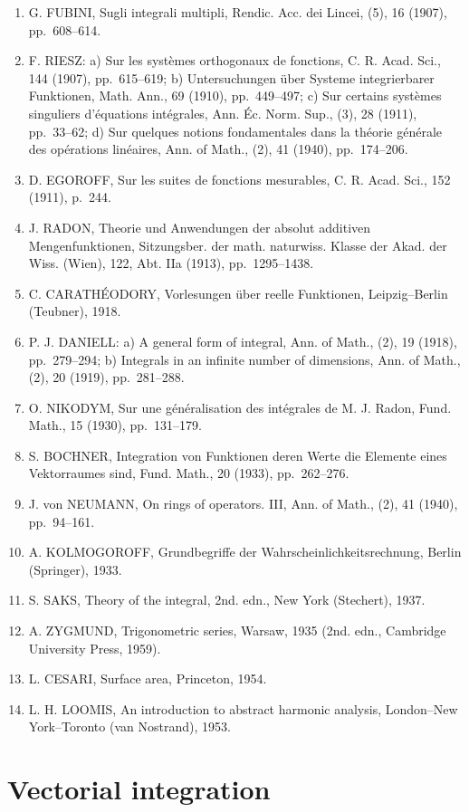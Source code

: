 \begin{enumerate}
\item
  G. FUBINI, Sugli integrali multipli, Rendic. Acc. dei Lincei, (5), 16 (1907), pp.~608--614.
\item
  F. RIESZ: a) Sur les systèmes orthogonaux de fonctions, C. R. Acad. Sci., 144 (1907), pp.~615--619; b) Untersuchungen über Systeme integrierbarer Funktionen, Math. Ann., 69 (1910), pp.~449--497; c) Sur certains systèmes singuliers d'équations intégrales, Ann. Éc. Norm. Sup., (3), 28 (1911), pp.~33--62; d) Sur quelques notions fondamentales dans la théorie générale des opérations linéaires, Ann. of Math., (2), 41 (1940), pp.~174--206.
\item
  D. EGOROFF, Sur les suites de fonctions mesurables, C. R. Acad. Sci., 152 (1911), p.~244.
\item
  J. RADON, Theorie und Anwendungen der absolut additiven Mengenfunktionen, Sitzungsber. der math. naturwiss. Klasse der Akad. der Wiss. (Wien), 122, Abt. IIa (1913), pp.~1295--1438.
\item
  C. CARATHÉODORY, Vorlesungen über reelle Funktionen, Leipzig--Berlin (Teubner), 1918.
\item
  P. J. DANIELL: a) A general form of integral, Ann. of Math., (2), 19 (1918), pp.~279--294; b) Integrals in an infinite number of dimensions, Ann. of Math., (2), 20 (1919), pp.~281--288.
\item
  O. NIKODYM, Sur une généralisation des intégrales de M. J. Radon, Fund. Math., 15 (1930), pp.~131--179.
\item
  S. BOCHNER, Integration von Funktionen deren Werte die Elemente eines Vektorraumes sind, Fund. Math., 20 (1933), pp.~262--276.
\item
  J. von NEUMANN, On rings of operators. III, Ann. of Math., (2), 41 (1940), pp.~94--161.
\item
  A. KOLMOGOROFF, Grundbegriffe der Wahrscheinlichkeitsrechnung, Berlin (Springer), 1933.
\item
  S. SAKS, Theory of the integral, 2nd. edn., New York (Stechert), 1937.
\item
  A. ZYGMUND, Trigonometric series, Warsaw, 1935 (2nd. edn., Cambridge University Press, 1959).
\item
  L. CESARI, Surface area, Princeton, 1954.
\item
  L. H. LOOMIS, An introduction to abstract harmonic analysis, London--New York--Toronto (van Nostrand), 1953.
\end{enumerate}

\chapter{Vectorial integration}

